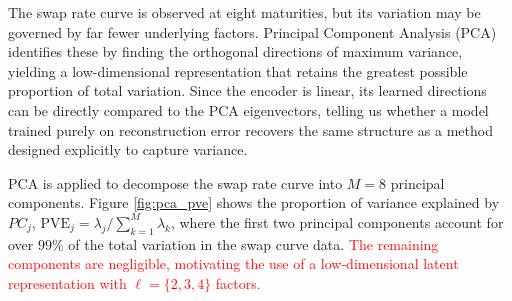The swap rate curve is observed at eight maturities, but its variation may be governed by far fewer underlying factors. Principal Component Analysis (PCA) identifies these by finding the orthogonal directions of maximum variance, yielding a low-dimensional representation that retains the greatest possible proportion of total variation. Since the encoder is linear, its learned directions can be directly compared to the PCA eigenvectors, telling us whether a model trained purely on reconstruction error recovers the same structure as a method designed explicitly to capture variance.


PCA is applied to decompose the swap rate curve into $M=8$ principal components. Figure \ref{fig:pca_pve} shows the proportion of variance explained by $PC_j$, $\mathrm{PVE}_j=\lambda_j/\sum_{k=1}^M\lambda_k$, where the first two principal components account for over $99\%$ of the total variation in the swap curve data. \textcolor{red}{The remaining components are negligible, motivating the use of a low-dimensional latent representation with $\ell = \{2,3,4\}$ factors.}


